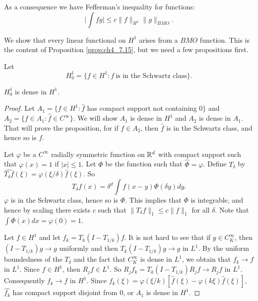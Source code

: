 As a consequence we have Fefferman's inequality for functions:
\begin{equation}\label{eq:ch4_7.19}
    \Big|\int fg\Big| \leq c\|f\|_{H^1}\|g\|_{BMO}.
\end{equation}

We show that every linear functional on $H^1$ arises from a $BMO$ function. This is the content of Proposition \ref{prop:ch4_7.15}, but we need a few propositions first.

Let
\[
    H_0^1 = \{f \in H^1 : f~\text{is in the Schwartz class}\}.
\]

\begin{proposition}\label{prop:ch4_7.13}
$H_0^1$ is dense in $H^1$.
\end{proposition}

\begin{proof}
Let $A_1 = \{f \in H^1 : \widehat{f}$ has compact support not containing $0\}$ and $A_2 = \{f \in A_1 : \widehat{f} \in C^\infty\}$. We will show $A_1$ is dense in $H^1$ and $A_2$ is dense in $A_1$. That will prove the proposition, for if $f \in A_2$, then $\widehat{f}$ is in the Schwartz class, and hence so is $f$.

Let $\varphi$ be a $C^\infty$ radially symmetric function on $\mathbb{R}^d$ with compact support such that $\varphi(x) = 1$ if $|x| \leq 1$. Let $\Phi$ be the function such that $\widehat{\Phi} = \varphi$. Define $T_\delta$ by $\widehat{T_\delta f}(\xi) = \varphi(\xi/\delta)\widehat{f}(\xi)$. So
\[
    T_\delta f(x) = \delta^d \int f(x-y)\Phi(\delta y)dy.
\]
$\varphi$ is in the Schwartz class, hence so is $\Phi$. This implies that $\Phi$ is integrable, and hence by scaling there exists $c$ such that $\|T_\delta f\|_1 \leq c\|f\|_1$ for all $\delta$. Note that $\int \Phi(x)dx = \varphi(0) = 1$.

Let $f \in H^1$ and let $f_k = T_k(I - T_{1/k})f$. It is not hard to see that if $g \in C_K^\infty$, then $(I - T_{1/k})g \to g$ uniformly and then $T_k(I - T_{1/k})g \to g$ in $L^1$. By the uniform boundedness of the $T_\delta$ and the fact that $C_K^\infty$ is dense in $L^1$, we obtain that $f_k \to f$ in $L^1$. Since $f \in H^1$, then $R_jf \in L^1$. So $R_jf_k = T_k(I - T_{1/k})R_jf \to R_jf$ in $L^1$. Consequently $f_k \to f$ in $H^1$. Since $\widehat{f_k}(\xi) = \varphi(\xi/k)[\widehat{f}(\xi)-\varphi(k\xi)\widehat{f}(\xi)]$, $\widehat{f_k}$ has compact support disjoint from $0$, or $A_1$ is dense in $H^1$.


\end{proof}
